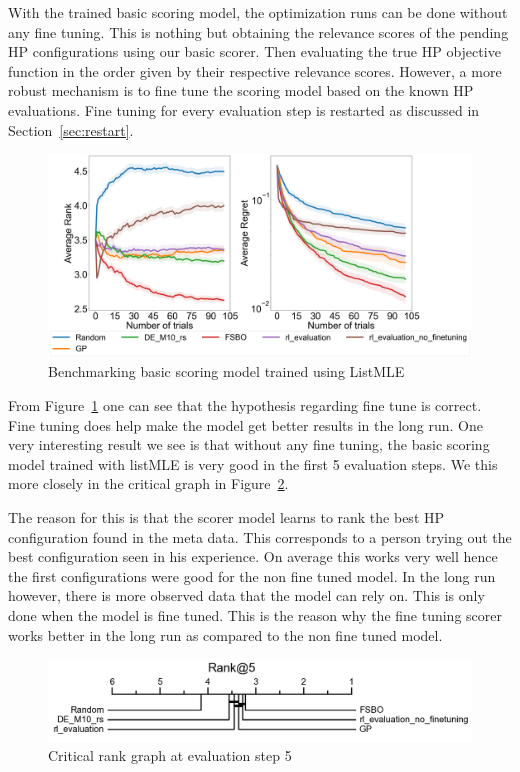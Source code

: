 \documentclass[12pt, twoside, ngerman]{report}
\begin{document}
With the trained basic scoring model,  the optimization runs can be done without any fine tuning.
This is nothing but obtaining the relevance scores of the pending HP configurations using our basic scorer.
Then evaluating the true HP objective function in the order given by their respective relevance scores.
However,  a more robust mechanism is to fine tune the scoring model based on the known HP evaluations.
Fine tuning for every evaluation step is restarted as discussed in Section~\ref{sec:restart}.

\begin{figure}[h]
  \centering
    \includegraphics[scale=0.25]{images/RLEvaluationBasicScoring}
    \caption{Benchmarking basic scoring model trained using ListMLE}
    \label{fig:RLEvaluationBasicScoring}
\end{figure}

From Figure~\ref{fig:RLEvaluationBasicScoring} one can see that the hypothesis regarding fine tune is correct.
Fine tuning does help make the model get better results in the long run.
One very interesting result we see is that without any fine tuning,  the basic scoring model trained with listMLE is very good in the first 5 evaluation steps.
We this more closely in the critical graph in Figure~\ref{fig:RLEvaluationBasicScoringRank5}.

The reason for this is that the scorer model learns to rank the best HP configuration found in the meta data.
This corresponds to a person trying out the best configuration seen in his experience.
On average this works very well hence the first configurations were good for the non fine tuned model.
In the long run however,  there is more observed data that the model can rely on.
This is only done when the model is fine tuned.
This is the reason why the fine tuning scorer works better in the long run as compared to the non fine tuned model.

\begin{figure}[h]
  \centering
    \includegraphics[scale=0.35]{images/RLEvaluationBasicScoringRank5}
    \caption{Critical rank graph at evaluation step 5}
    \label{fig:RLEvaluationBasicScoringRank5}
\end{figure}
\end{document}
